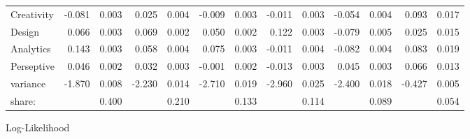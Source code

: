 \documentclass[12pt]{article}
\begin{document}
\begin{landscape}
\begin{table}
\begin{threeparttable}
{\begin{tabular}[l]{l r r r r r r r r r r r r}
Creativity        &    -0.081	 &    0.003	  &      0.025 &    0.004	 &     -0.009	 &    0.003   &      -0.011	&     0.003	 &     -0.054	 &    0.004	    &     0.093	  &     0.017  \\
Design            &     0.066	 &    0.003	  &      0.069 &    0.002	 &      0.050	 &    0.002   &       0.122	&     0.003	 &     -0.079	 &    0.005	    &     0.025	  &     0.015  \\
Analytics         &     0.143	 &    0.003	  &      0.058 &    0.004	 &      0.075	 &    0.003   &      -0.011	&     0.004	 &     -0.082	 &    0.004	    &     0.083	  &     0.019  \\
Perseptive        &     0.046	 &    0.002	  &      0.032 &    0.003	 &     -0.001	 &    0.002   &      -0.013	&     0.003	 &      0.045	 &    0.003	    &     0.066	  &     0.013  \\
variance          &    -1.870	 &    0.008	  &     -2.230 &    0.014	 &     -2.710	 &    0.019   &      -2.960	&     0.025	 &     -2.400	 &    0.018	    &    -0.427	  &     0.005  \\
\cmidrule(l){2-3}  \cmidrule(l){4-5}  \cmidrule(l){6-7}   \cmidrule(l){8-9}  \cmidrule(l){10-11}  \cmidrule(l){12-13}
share:            &            &    0.400   &            &    0.210  &             &    0.133   &             &     0.114  &             &    0.089     &             &     0.054  \\
\cmidrule{1-13} 
      \end{tabular}
      }
      \begin{tablenotes}
        \item Log-Likelihood

      \end{tablenotes} \label{tbl:6E_full_regressions_results}


    \end{threeparttable}

\end{table}

\end{landscape}
\end{document}
